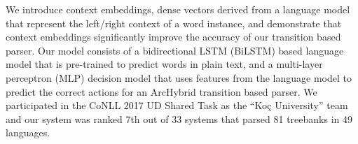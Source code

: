We introduce context embeddings, dense vectors derived from a language model that represent the left/right context of a word instance, and demonstrate that context embeddings significantly improve the accuracy of our transition based parser. Our model consists of a bidirectional LSTM (BiLSTM) based language model that is pre-trained to predict words in plain text, and a multi-layer perceptron (MLP) decision model that uses features from the language model to predict the correct actions for an ArcHybrid transition based parser. We participated in the CoNLL 2017 UD Shared Task as the ``Koç University'' team and our system was ranked 7th out of 33 systems that parsed 81 treebanks in 49 languages.
